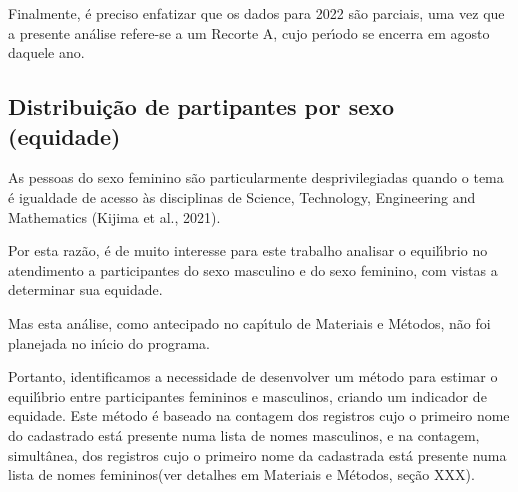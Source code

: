 \documentclass[
12pt,		%
openright,	%
twoside,  %
a4paper,			%
chapter=TITLE,		%
english,			%
french,				%
spanish,			%
brazil				%
]{USPSC-classe/USPSC}
\begin{document}
Finalmente, \'e preciso enfatizar que os dados para 2022 s\~ao parciais, uma vez que a presente an\'alise refere-se a um Recorte A, cujo per\'{\i}odo se encerra em agosto daquele ano.










\subsection[Distribui\c{c}\~ao de partipantes por sexo (equidade)]{Distribui\c{c}\~ao de partipantes por sexo (equidade)}\label{Distribui\c{c}\~ao de partipantes por sexo (equidade)}
As pessoas do sexo feminino s\~ao particularmente desprivilegiadas quando o tema \'e igualdade de acesso \`as disciplinas de Science, Technology, Engineering and Mathematics (Kijima et al., 2021).










Por esta raz\~ao, \'e de muito interesse para este trabalho analisar o equil\'{\i}brio no atendimento a participantes do sexo masculino e do sexo feminino, com vistas a determinar sua equidade.










Mas esta an\'alise, como antecipado no cap\'{\i}tulo de Materiais e M\'etodos, n\~ao foi planejada no in\'{\i}cio do programa.










Portanto, identificamos a necessidade de desenvolver um m\'etodo para estimar o equil\'{\i}brio entre participantes femininos e masculinos, criando um indicador de equidade. Este m\'etodo \'e baseado na contagem dos registros cujo o primeiro nome do cadastrado est\'a presente numa lista de \textquotedbl nomes masculinos\textquotedbl , e na contagem, simult\^anea, dos registros cujo o primeiro nome da cadastrada est\'a presente numa lista de \textquotedbl nomes femininos\textquotedbl  (ver detalhes em Materiais e M\'etodos, se\c{c}\~ao XXX).
\end{document}
